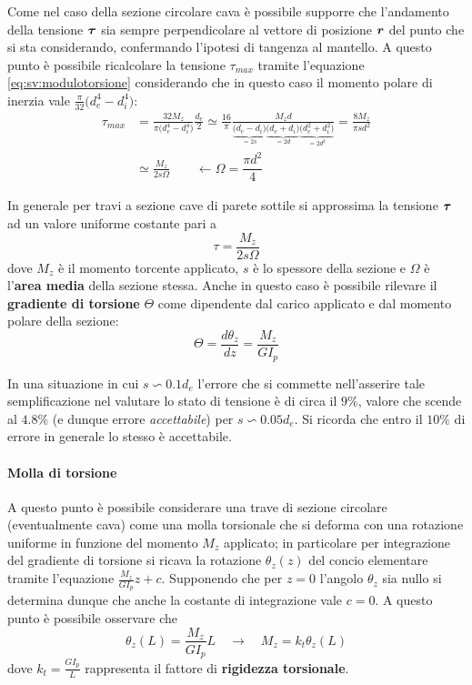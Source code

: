     	Come nel caso della sezione circolare cava è possibile supporre che l'andamento della tensione $\boldsymbol{\tau}$ sia sempre perpendicolare al vettore di posizione $\boldsymbol{r}$ del punto che si sta considerando, confermando l'ipotesi di tangenza al mantello. A questo punto è possibile ricalcolare la tensione $\tau_{max}$ tramite l'equazione \ref{eq:sv:modulotorsione} considerando che in questo caso il momento polare di inerzia vale $\frac \pi {32} \big(d_e^4-d_i^4\big)$:
    	\begin{align*}
    		\tau_{max} &= \frac{32 M_z}{\pi\big(d_e^4 - d_i^4\big)} \frac { d_e}2  \simeq \frac{16}{\pi} \frac{M_z  d}{  \underbrace{\big(d_e-d_i\big)}_{=2s} \underbrace{\big(d_e + d_i\big)}_{=2d} \underbrace{\big(d_e^2 + d_i^2\big)}_{=2d^2}  } = \frac{8M_z}{\pi sd^2} \\
    		& \simeq \frac{M_z}{2s \Omega} \qquad \leftarrow \Omega =  \dfrac{\pi d^2}{4}
    	\end{align*}
    
    	\begin{concetto}
    		In generale per travi a sezione cave di parete sottile si approssima la tensione $\boldsymbol{\tau}$ ad un valore uniforme costante pari a 
    		\begin{equation}
    			\tau = \frac{M_z}{2s\Omega}
    		\end{equation}
    		dove $M_z$ è il momento torcente applicato, $s$ è lo spessore della sezione e $\Omega$ è l'\textbf{area media} della sezione stessa. Anche in questo caso è possibile rilevare il \textbf{gradiente di torsione} $\Theta$ come dipendente dal carico applicato e dal momento polare della sezione:
    		\[ \Theta = \frac{d\theta_z}{dz} = \frac{M_z}{GI_p} \]
    	\end{concetto}
    	\begin{nota}
    		In una situazione in cui $s\backsim 0.1d_e$ l'errore che si commette nell'asserire tale semplificazione nel valutare lo stato di tensione è di circa il $9\%$, valore che scende al $4.8\%$ (e dunque errore \textit{accettabile}) per $s\backsim 0.05 d_e$. Si ricorda che entro il $10\%$ di errore in generale lo stesso è accettabile.
    	\end{nota}
    	
    	\paragraph{Molla di torsione} A questo punto è possibile considerare una trave di sezione circolare (eventualmente cava) come una molla torsionale che si deforma con una rotazione uniforme in funzione del momento $M_z$ applicato; in particolare per integrazione del gradiente di torsione si ricava la rotazione $\theta_z(z)$ del concio elementare tramite l'equazione $\frac{M_z}{GI_p} z + c$. Supponendo che per $z=0$ l'angolo $\theta_z$ sia nullo si determina dunque che anche la costante di integrazione vale $c=0$. A questo punto è possibile osservare che
    	\[ \theta_z(L) = \frac{M_z}{G I_p} L \quad \rightarrow \quad M_z = k_t \theta_z(L)  \]
    	dove $k_t = \frac{G I_p}{L}$ rappresenta il fattore di \textbf{rigidezza torsionale}.
    	
